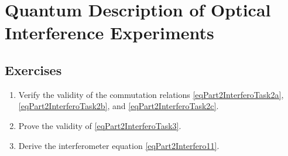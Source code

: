 \chapter{Quantum Description of Optical Interference Experiments}
\label{chInterfero}





\section{Exercises}
\begin{enumerate}
\item Verify the validity of the commutation relations
  \eqref{eqPart2InterferoTask2a}, \eqref{eqPart2InterferoTask2b}, and
  \eqref{eqPart2InterferoTask2c}. 
\item Prove the validity of \eqref{eqPart2InterferoTask3}.
\item Derive the interferometer equation \eqref{eqPart2Interfero11}.
\end{enumerate}


